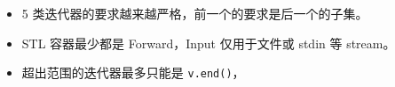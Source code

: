 
\begin{itemize}
\item 5 类迭代器的要求越来越严格，前一个的要求是后一个的子集。
\item STL 容器最少都是 Forward，Input 仅用于文件或 stdin 等 stream。
\item 超出范围的迭代器最多只能是 \verb`v.end()`，
\end{itemize}

